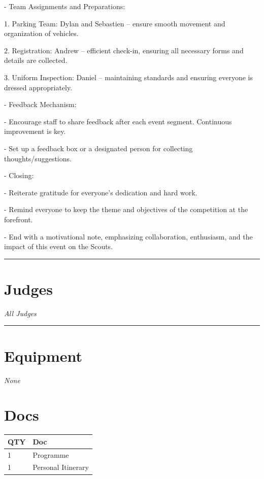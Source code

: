 \documentclass[10pt]{article}
\begin{document}
- Team Assignments and Preparations:

  1. Parking Team: Dylan and Sebastien – ensure smooth movement and organization of vehicles.

  2. Registration: Andrew – efficient check-in, ensuring all necessary forms and details are collected.

  3. Uniform Inspection: Daniel – maintaining standards and ensuring everyone is dressed appropriately.



- Feedback Mechanism:

  - Encourage staff to share feedback after each event segment. Continuous improvement is key.

  - Set up a feedback box or a designated person for collecting thoughts/suggestions.



- Closing:

  - Reiterate gratitude for everyone's dedication and hard work.

  - Remind everyone to keep the theme and objectives of the competition at the forefront.

  - End with a motivational note, emphasizing collaboration, enthusiasm, and the impact of this event on the Scouts.
\vspace{0.5cm}
	\hrule
	\vspace{0.5cm}
		\section*{\faUsers \: Judges}

					\textit{All Judges}
			\vspace{0.5cm}
	\hrule
	\vspace{0.5cm}

	\begin{multicols}{2}

		\section*{\faWrench \: Equipment}

				\textit{None}
		
		\vfill\null
		\columnbreak

			\section*{\faFile \: Docs}
		 	\begin{center}
			\begin{tabular}{p{2cm}p{4cm}}

			\textbf{QTY} & \textbf{Doc} \\\toprule
										1&Programme\\\midrule
										1&Personal Itinerary\\\midrule
							\end{tabular}
			\end{center}
	

		\vfill\null

		\end{multicols}
\end{document}
